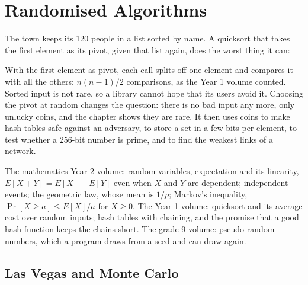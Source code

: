 \chapter{Randomised Algorithms}\label{ch:b2:randomised-algorithms}

The town keeps its 120 people in a list sorted by name. A quicksort that takes the first element as its pivot, given
that list again, does the worst thing it can:

\label{lst:b2:randomised-algorithms:hook}

\label{out:b2:randomised-algorithms:hook}

With the first element as pivot, each call splits off one element and compares it with all the others: $n(n-1)/2$
comparisons, as the Year 1 volume counted. Sorted input is not rare, so a library cannot hope that its users avoid it.
Choosing the pivot at random changes the question: there is no bad input any more, only unlucky coins, and the chapter
shows they are rare. It then uses coins to make hash tables safe against an adversary, to store a set in a few bits per
element, to test whether a 256-bit number is prime, and to find the weakest links of a network.

\begin{recall}
The mathematics Year 2 volume: random variables, expectation and its linearity, $E[X + Y] = E[X] + E[Y]$ even when $X$
and $Y$ are dependent; independent events; the geometric law, whose mean is $1/p$; Markov's inequality, $\Pr[X \geq a]
\leq E[X]/a$ for $X \geq 0$. The Year 1 volume: quicksort and its average cost over random inputs; hash tables with
chaining, and the promise that a good hash function keeps the chains short. The grade 9 volume: pseudo-random numbers,
which a program draws from a seed and can draw again.
\end{recall}

\section{Las Vegas and Monte Carlo}\label{sec:b2:randomised-algorithms:kinds}

